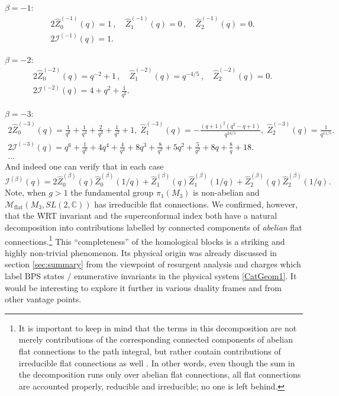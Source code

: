 \documentclass[hyper,letterpaper]{JHEP3}
\newcommand{\C}{{\mathbb C}}
\renewcommand{\hat}{\widehat}
\def\CI{{\mathcal I}}
\def\CM{{\mathcal M}}
\begin{document}
$\beta=-1$:
\begin{equation}
	\begin{array}{c}
	2\hat{Z}_0^{(-1)}(q)=1 \,,\quad
	\hat{Z}_1^{(-1)}(q)=0 \,,\quad
	\hat{Z}_2^{(-1)}(q)=0.\; \\
		2\CI^{(-1)}(q)=1.
	\end{array}
\end{equation}

$\beta=-2$:
\begin{equation}
	\begin{array}{c}
	2\hat{Z}_0^{(-2)}(q)=q^{-2}+1 \,,\quad
	\hat{Z}_1^{(-2)}(q)=q^{-4/5} \,,\quad
	\hat{Z}_2^{(-2)}(q)=0.\; \\
		2\CI^{(-2)}(q)=4+q^2+\frac{1}{q^2}.
	\end{array}
\end{equation}

$\beta=-3$:
\begin{equation}
	\begin{array}{c}
	2\hat{Z}_0^{(-3)}(q)=\frac{1}{q^6}+\frac{1}{q^4}+\frac{2}{q^3}+\frac{1}{q^2}+1,\;
	\hat{Z}_1^{(-3)}(q)=-\frac{(q+1)^2
   \left(q^2-q+1\right)}{q^{24/5}},\;
	\hat{Z}_2^{(-3)}(q)=\frac{1}{q^{11/5}}.\; \\
		2\CI^{(-3)}(q)=q^6+\frac{1}{q^6}+4 q^4+\frac{4}{q^4}+8 q^3+\frac{8}{q^3}+5 q^2+\frac{5}{q^2}+8 q+\frac{8}{q}+18.
		\\
		\ldots
	\end{array}
\end{equation}
And indeed one can verify that in each case
\begin{equation}
	\CI^{(\beta)}(q)=2\hat{Z}_0^{(\beta)}(q)\hat{Z}_0^{(\beta)}(1/q)+
	\hat{Z}_1^{(\beta)}(q)\hat{Z}_1^{(\beta)}(1/q)+
	\hat{Z}_2^{(\beta)}(q)\hat{Z}_2^{(\beta)}(1/q).
\end{equation}
Note, when $g>1$ the fundamental group $\pi_1(M_3)$ is non-abelian and $\CM_\text{flat}(M_3,SL(2,\C))$ has irreducible flat connections.
We confirmed, however, that the WRT invariant and the superconformal index both have a natural decomposition into contributions labelled by connected components of \textit{abelian} flat connections.\footnote{It is important to keep in mind that the terms in this decomposition are not merely contributions of the corresponding connected components of abelian flat connections to the path integral, but rather contain contributions of irreducible flat connections as well \cite{Gukov:2016njj}. In other words, even though the sum in the decomposition runs only over abelian flat connections, all flat connections are accounted properly, reducible and irreducible; no one is left behind.}
This ``completeness'' of the homological blocks is a striking and highly non-trivial phenomenon.
Its physical origin was already discussed in section \ref{sec:summary} from the viewpoint of resurgent analysis
and charges which label BPS states / enumerative invariants in the physical system \eqref{CatGeom1}.
It would be interesting to explore it further in various duality frames and from other vantage points.
\end{document}
